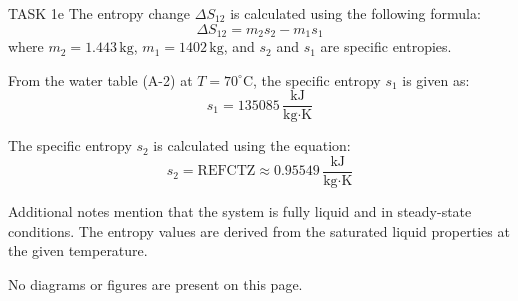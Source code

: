 TASK 1e  
The entropy change \( \Delta S_{12} \) is calculated using the following formula:  
\[
\Delta S_{12} = m_2 s_2 - m_1 s_1
\]  
where \( m_2 = 1.443 \, \text{kg} \), \( m_1 = 1402 \, \text{kg} \), and \( s_2 \) and \( s_1 \) are specific entropies.  

From the water table (A-2) at \( T = 70^\circ\text{C} \), the specific entropy \( s_1 \) is given as:  
\[
s_1 = 135085 \, \frac{\text{kJ}}{\text{kg·K}}
\]  

The specific entropy \( s_2 \) is calculated using the equation:  
\[
s_2 = \text{REFCTZ} \approx 0.95549 \, \frac{\text{kJ}}{\text{kg·K}}
\]  

Additional notes mention that the system is fully liquid and in steady-state conditions. The entropy values are derived from the saturated liquid properties at the given temperature.  

No diagrams or figures are present on this page.